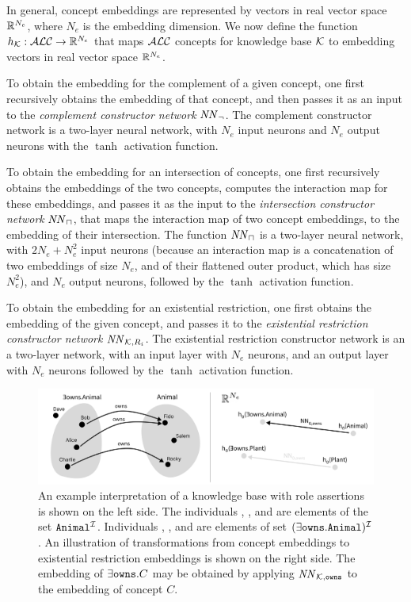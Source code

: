 In general, concept embeddings are represented by vectors in real vector space $\mathbb{R}^{N_e}$, where $N_e$ is the embedding dimension.
We now define the function $h_{\mathcal{K}} : \mathcal{ALC} \rightarrow \mathbb{R}^{N_e}$ that maps $\mathcal{ALC}$ concepts for knowledge base $\mathcal{K}$ to embedding vectors in real vector space $\mathbb{R}^{N_e}$.

To obtain the embedding for the complement of a given concept, one first recursively obtains the embedding of that concept, and then passes it as an input to the \emph{complement constructor network} $\mathit{NN}_\lnot$.
The complement constructor network is a two-layer neural network, with $N_e$ input neurons and $N_e$ output neurons with the $\tanh$ activation function.

To obtain the embedding for an intersection of concepts, one first recursively obtains the embeddings of the two concepts, computes the interaction map for these embeddings, and passes it as the input to the \emph{intersection constructor network} $\mathit{NN}_\sqcap$, that maps the interaction map of two concept embeddings, to the embedding of their intersection.
The function $\mathit{NN}_\sqcap$ is a two-layer neural network, with $2N_e + N_e^2$ input neurons (because an interaction map is a concatenation of two embeddings of size $N_e$, and of their flattened outer product, which has size $N_e^2$), and $N_e$ output neurons, followed by the $\tanh$ activation function.

To obtain the embedding for an existential restriction, one first obtains the embedding of the given concept, and passes it to the \emph{existential restriction constructor network} $\mathit{NN}_{\mathcal{K},R_i}$.
The existential restriction constructor network is an a two-layer network, with an input layer with $N_e$ neurons, and an output layer with $N_e$ neurons followed by the $\tanh$ activation function.

\begin{figure}
\centering\includegraphics[width=\linewidth]{figures/role.png}
\caption{
An example interpretation of a knowledge base with role assertions is shown on the left side.
The individuals , , and  are elements of the set $\texttt{Animal}^{\mathcal{I}}$.
Individuals , , and  are elements of set $(\exists \texttt{owns} . \texttt{Animal})^{\mathcal{I}}$.
An illustration of transformations from concept embeddings to existential restriction embeddings is shown on the right side.
The embedding of $\exists \texttt{owns} . C$ may be obtained by applying $\mathit{NN}_{\mathcal{K},\texttt{owns}}$ to the embedding of concept $C$.
}
\label{fig:role}
\end{figure}

